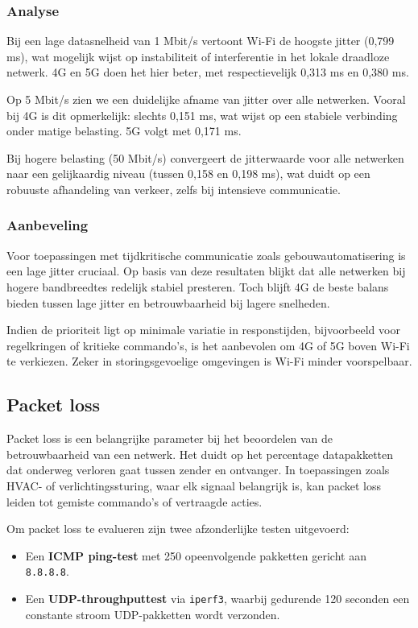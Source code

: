 \subsubsection{Analyse}
Bij een lage datasnelheid van 1 Mbit/s vertoont Wi-Fi de hoogste jitter (0,799 ms), wat mogelijk wijst op instabiliteit of interferentie in het lokale draadloze netwerk. 4G en 5G doen het hier beter, met respectievelijk 0,313 ms en 0,380 ms.

Op 5 Mbit/s zien we een duidelijke afname van jitter over alle netwerken. Vooral bij 4G is dit opmerkelijk: slechts 0,151 ms, wat wijst op een stabiele verbinding onder matige belasting. 5G volgt met 0,171 ms.

Bij hogere belasting (50 Mbit/s) convergeert de jitterwaarde voor alle netwerken naar een gelijkaardig niveau (tussen 0,158 en 0,198 ms), wat duidt op een robuuste afhandeling van verkeer, zelfs bij intensieve communicatie.

\subsubsection{Aanbeveling}
Voor toepassingen met tijdkritische communicatie zoals gebouwautomatisering is een lage jitter cruciaal. Op basis van deze resultaten blijkt dat alle netwerken bij hogere bandbreedtes redelijk stabiel presteren. Toch blijft 4G de beste balans bieden tussen lage jitter en betrouwbaarheid bij lagere snelheden.

Indien de prioriteit ligt op minimale variatie in responstijden, bijvoorbeeld voor regelkringen of kritieke commando's, is het aanbevolen om 4G of 5G boven Wi-Fi te verkiezen. Zeker in storingsgevoelige omgevingen is Wi-Fi minder voorspelbaar.

\subsection{Packet loss}
Packet loss is een belangrijke parameter bij het beoordelen van de betrouwbaarheid van een netwerk. Het duidt op het percentage datapakketten dat onderweg verloren gaat tussen zender en ontvanger. In toepassingen zoals HVAC- of verlichtingssturing, waar elk signaal belangrijk is, kan packet loss leiden tot gemiste commando’s of vertraagde acties.

Om packet loss te evalueren zijn twee afzonderlijke testen uitgevoerd:
\begin{itemize}
    \item Een \textbf{ICMP ping-test} met 250 opeenvolgende pakketten gericht aan \texttt{8.8.8.8}.
    \item Een \textbf{UDP-throughputtest} via \texttt{iperf3}, waarbij gedurende 120 seconden een constante stroom UDP-pakketten wordt verzonden.
\end{itemize}

